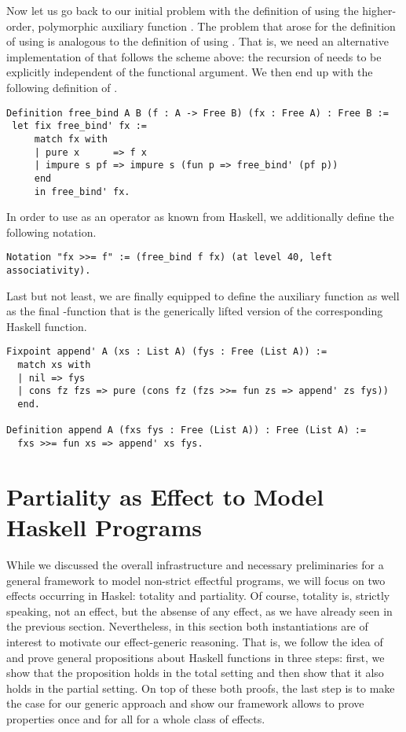 Now let us go back to our initial problem with the definition of
 using the higher-order, polymorphic auxiliary function
.
The problem that arose for the definition of  using
 is analogous to the definition of 
using .
That is, we need an alternative implementation of 
that follows the scheme above: the recursion of  needs to
be explicitly independent of the functional argument.
We then end up with the following definition of .

\begin{verbatim}
Definition free_bind A B (f : A -> Free B) (fx : Free A) : Free B :=
 let fix free_bind' fx :=
     match fx with
     | pure x      => f x
     | impure s pf => impure s (fun p => free_bind' (pf p))
     end
     in free_bind' fx.
\end{verbatim}

In order to use  as an operator \cinl{(>>=)} as known
from Haskell, we additionally define the following notation.

\begin{verbatim}
Notation "fx >>= f" := (free_bind f fx) (at level 40, left associativity).
\end{verbatim}

Last but not least, we are finally equipped to define the auxiliary
function  as well as the final -function
that is the generically lifted version of the corresponding Haskell
function.

\begin{verbatim}
Fixpoint append' A (xs : List A) (fys : Free (List A)) :=
  match xs with
  | nil => fys
  | cons fz fzs => pure (cons fz (fzs >>= fun zs => append' zs fys))
  end.

Definition append A (fxs fys : Free (List A)) : Free (List A) :=
  fxs >>= fun xs => append' xs fys.
\end{verbatim}

\section{Partiality as Effect to Model Haskell Programs}

While we discussed the overall infrastructure and necessary
preliminaries for a general framework to model non-strict effectful
programs, we will focus on two effects occurring in Haskel: totality
and partiality.
Of course, totality is, strictly speaking, not an effect, but the
absense of any effect, as we have already seen in the previous
section.
Nevertheless, in this section both instantiations are of interest to
motivate our effect-generic reasoning.
That is, we follow the idea of \citet{abel2005verifying} and prove
general propositions about Haskell functions in three steps: first, we
show that the proposition holds in the total setting and then show that it
also holds in the partial setting.
On top of these both proofs, the last step is to make the case for our
generic approach and show our framework allows to prove properties
once and for all for a whole class of effects.

